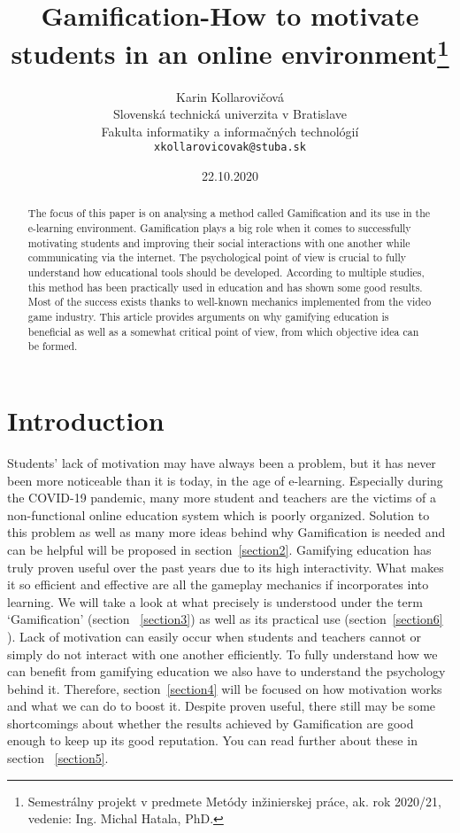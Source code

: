 \documentclass[10pt,twoside,english,a4paper]{article}
\title{Gamification-How to motivate students in an online environment\thanks{Semestrálny projekt v predmete Metódy inžinierskej práce, ak. rok 2020/21, vedenie: Ing. Michal Hatala, PhD.}}
\author{Karin Kollarovičová\\[2pt]
	{\small Slovenská technická univerzita v Bratislave}\\
	{\small Fakulta informatiky a informačných technológií}\\
	{\small \texttt{xkollarovicovak@stuba.sk}}
	}
\date{\small 22.10.2020}
\begin{document}
\maketitle

\begin{abstract}
	The focus of this paper is on analysing a method called Gamification and its use in the e-learning environment. 
	Gamification plays a big role when it comes to successfully motivating students and improving their social interactions with one another while communicating via the internet. 
	The psychological point of view is crucial to fully understand how educational tools should be developed. 
	According to multiple studies, this method has been practically used in education and has shown some good results. 
	Most of the success exists thanks to well-known mechanics implemented from the video game industry. 
	This article provides arguments on why gamifying education is beneficial as well as a somewhat critical point of view, from which objective idea can be formed. 
\end{abstract}



\section{Introduction} \label{introduction}
	Students’ lack of motivation may have always been a problem, but it has never been more noticeable than it is today, in the age of e-learning. 
	Especially during the COVID-19 pandemic, many more student and teachers are the victims of a non-functional online education system which is poorly organized.
	Solution to this problem as well as many more ideas behind why Gamification is needed and can be helpful will be proposed in section~\ref{section2}. 
	Gamifying education has truly proven useful over the past years due to its high interactivity. What makes it so efficient and effective are all the gameplay mechanics if incorporates into learning.
	We will take a look at what precisely is understood under the term ‘Gamification’ (section ~\ref{section3}) as well as its practical use (section~\ref{section6} ).
	Lack of motivation can easily occur when students and teachers cannot or simply do not interact with one another efficiently. To fully understand how we can benefit from gamifying education we also have to understand the psychology behind it.
	Therefore, section~\ref{section4} will be focused on how motivation works and what we can do to boost it. Despite proven useful, there still may be some shortcomings about whether the results achieved by Gamification are good enough to keep up its good reputation. You can read further about these in section ~\ref{section5}.
\end{document}

